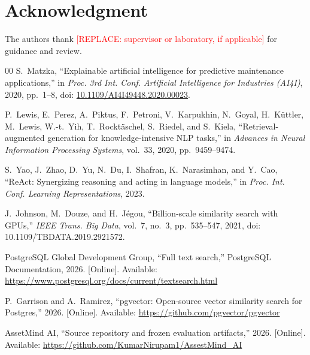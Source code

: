 \documentclass[conference]{IEEEtran}
\newcommand{\system}{AssetMind AI}
\newcommand{\todo}[1]{\textcolor{red}{[REPLACE: #1]}}
\begin{document}
\section*{Acknowledgment}
The authors thank \todo{supervisor or laboratory, if applicable} for
guidance and review.

\begin{thebibliography}{00}
S.~Matzka, ``Explainable artificial intelligence for predictive maintenance
applications,'' in \emph{Proc. 3rd Int. Conf. Artificial Intelligence for
Industries (AI4I)}, 2020, pp.~1--8, doi:
\href{https://doi.org/10.1109/AI4I49448.2020.00023}{10.1109/AI4I49448.2020.00023}.

P.~Lewis, E.~Perez, A.~Piktus, F.~Petroni, V.~Karpukhin, N.~Goyal,
H.~Küttler, M.~Lewis, W.-t.~Yih, T.~Rocktäschel, S.~Riedel, and
S.~Kiela, ``Retrieval-augmented generation for knowledge-intensive NLP
tasks,'' in \emph{Advances in Neural Information Processing Systems},
vol.~33, 2020, pp.~9459--9474.

S.~Yao, J.~Zhao, D.~Yu, N.~Du, I.~Shafran, K.~Narasimhan, and Y.~Cao,
``ReAct: Synergizing reasoning and acting in language models,'' in
\emph{Proc. Int. Conf. Learning Representations}, 2023.

J.~Johnson, M.~Douze, and H.~Jégou, ``Billion-scale similarity search with
GPUs,'' \emph{IEEE Trans. Big Data}, vol.~7, no.~3, pp.~535--547, 2021,
doi: 10.1109/TBDATA.2019.2921572.

PostgreSQL Global Development Group, ``Full text search,'' PostgreSQL
Documentation, 2026. [Online]. Available:
\url{https://www.postgresql.org/docs/current/textsearch.html}

P.~Garrison and A.~Ramirez, ``pgvector: Open-source vector similarity search
for Postgres,'' 2026. [Online]. Available:
\url{https://github.com/pgvector/pgvector}

\system, ``Source repository and frozen evaluation artifacts,'' 2026.
[Online]. Available:
\url{https://github.com/KumarNirupam1/AssestMind_AI}
\end{thebibliography}
\end{document}
